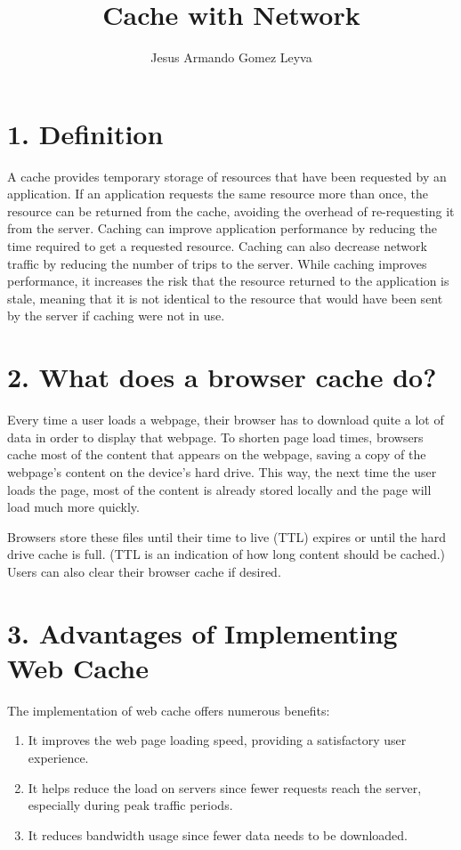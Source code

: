 \documentclass[12pt]{article}
\title{Cache with Network}
\author{Jesus Armando Gomez Leyva}
\begin{document}
\maketitle

\section*{1. Definition}
A cache provides temporary storage of resources that have been requested by an application. If an application requests the same resource more than once, the resource can be returned from the cache, avoiding the overhead of re-requesting it from the server. Caching can improve application performance by reducing the time required to get a requested resource. Caching can also decrease network traffic by reducing the number of trips to the server. While caching improves performance, it increases the risk that the resource returned to the application is stale, meaning that it is not identical to the resource that would have been sent by the server if caching were not in use.

\citep*{Microsoft}

\section*{2. What does a browser cache do?}
Every time a user loads a webpage, their browser has to download quite a lot of data in order to display that webpage. To shorten page load times, browsers cache most of the content that appears on the webpage, saving a copy of the webpage's content on the device’s hard drive. This way, the next time the user loads the page, most of the content is already stored locally and the page will load much more quickly.

Browsers store these files until their time to live (TTL) expires or until the hard drive cache is full. (TTL is an indication of how long content should be cached.) Users can also clear their browser cache if desired.

\citep*{CloudFare}
\section*{3. Advantages of Implementing Web Cache}
The implementation of web cache offers numerous benefits:


\begin{enumerate}[label=\arabic*.]
    \item It improves the web page loading speed, providing a satisfactory user experience.
    \item It helps reduce the load on servers since fewer requests reach the server, especially during peak traffic periods.
    \item It reduces bandwidth usage since fewer data needs to be downloaded.
\end{enumerate}
\end{document}
